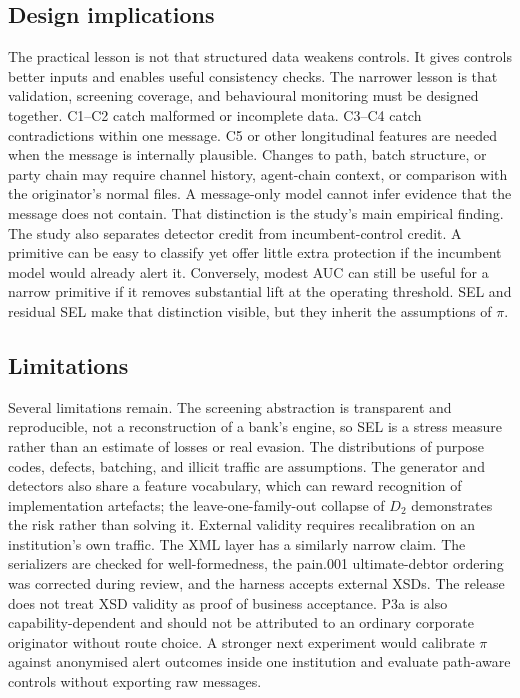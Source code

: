 \documentclass[conference]{IEEEtran}
\begin{document}
\subsection{Design implications}
The practical lesson is not that structured data weakens controls. It gives
controls better inputs and enables useful consistency checks. The narrower
lesson is that validation, screening coverage, and behavioural monitoring must
be designed together. C1--C2 catch malformed or incomplete data. C3--C4 catch
contradictions within one message. C5 or other longitudinal features are
needed when the message is internally plausible. Changes to path, batch
structure, or party chain may require channel history, agent-chain context, or
comparison with the originator's normal files. A message-only model cannot
infer evidence that the message does not contain. That distinction is the
study's main empirical finding.
The study also separates detector credit from incumbent-control credit. A
primitive can be easy to classify yet offer little extra protection if the
incumbent model would already alert it. Conversely, modest AUC can still be
useful for a narrow primitive if it removes substantial lift at the operating
threshold. SEL and residual SEL make that distinction visible, but they inherit
the assumptions of $\pi$.
\subsection{Limitations}
Several limitations remain. The screening abstraction is transparent and
reproducible, not a reconstruction of a bank's engine, so SEL is a stress
measure rather than an estimate of losses or real evasion. The distributions
of purpose codes, defects, batching, and illicit traffic are assumptions. The
generator and detectors also share a feature vocabulary, which can reward
recognition of implementation artefacts; the leave-one-family-out collapse of
$D_2$ demonstrates the risk rather than solving it. External validity requires
recalibration on an institution's own traffic.
The XML layer has a similarly narrow claim. The serializers are checked for
well-formedness, the pain.001 ultimate-debtor ordering was corrected during
review, and the harness accepts external XSDs. The release does not treat XSD
validity as proof of business acceptance. P3a is also capability-dependent and
should not be attributed to an ordinary corporate originator without route
choice.
A stronger next experiment would calibrate $\pi$ against anonymised alert
outcomes inside one institution and evaluate path-aware controls without
exporting raw messages.
 
\end{document}
